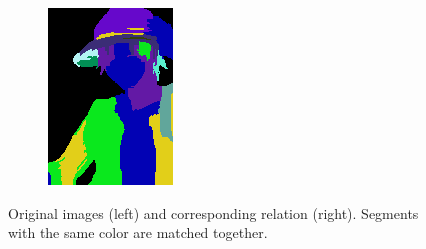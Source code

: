 \documentclass{beamer}
\begin{document}
\begin{frame}
\begin{figure}
\begin{subfigure}{0.24\textwidth}
\includegraphics[width=\textwidth]{../images/luffy_match2.png}
\end{subfigure}
\caption{Original images (left) and corresponding relation (right). Segments with the same color are matched together.}
\end{figure}

\end{frame}
\end{document}
